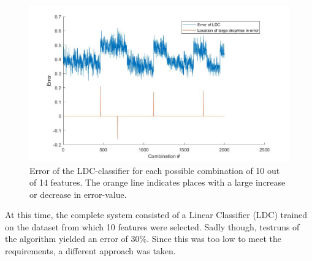 \begin{figure}[H]
	\centering
	\includegraphics[scale=0.45]{images/feat_jumps.jpg}
	\caption{Error of the LDC-classifier for each possible combination of 10 out of 14 features. The orange line indicates places with a large increase or decrease in error-value.}
	\label{fig:feat_jumps}
\end{figure}
\noindent At this time, the complete system consisted of a Linear Classifier (LDC) trained on the dataset from which 10 features were selected. Sadly though, testruns of the algorithm yielded an error of 30\%. Since this was too low to meet the requirements, a different approach was taken. \\
